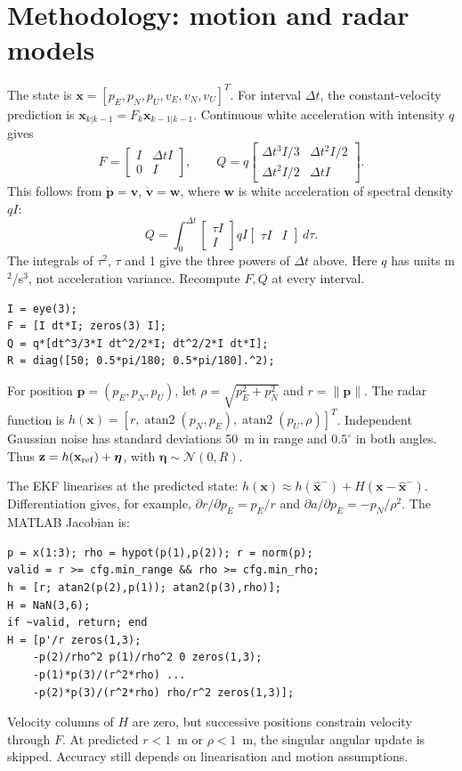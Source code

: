 \documentclass[12pt,a4paper]{article}
\begin{document}
\section{Methodology: motion and radar models}
The state is $\mathbf{x}=[p_E,p_N,p_U,v_E,v_N,v_U]^T$. For interval $\Delta t$, the constant-velocity prediction is $\mathbf{x}_{k|k-1}=F_k\mathbf{x}_{k-1|k-1}$. Continuous white acceleration with intensity $q$ gives
\[
F=\begin{bmatrix}I&\Delta t I\\0&I\end{bmatrix},\qquad
Q=q\begin{bmatrix}\Delta t^3 I/3&\Delta t^2 I/2\\\Delta t^2 I/2&\Delta t I\end{bmatrix}.
\]
This follows from $\dot{\mathbf p}=\mathbf v$, $\dot{\mathbf v}=\mathbf w$, where $\mathbf w$ is white acceleration of spectral density $qI$:
\[
Q=\int_0^{\Delta t}\begin{bmatrix}\tau I\\I\end{bmatrix}
qI\begin{bmatrix}\tau I&I\end{bmatrix}\,d\tau.
\]
The integrals of $\tau^2$, $\tau$ and 1 give the three powers of $\Delta t$ above. Here $q$ has units m$^2$/s$^3$, not acceleration variance. Recompute $F,Q$ at every interval.
\begin{lstlisting}
I = eye(3);
F = [I dt*I; zeros(3) I];
Q = q*[dt^3/3*I dt^2/2*I; dt^2/2*I dt*I];
R = diag([50; 0.5*pi/180; 0.5*pi/180].^2);
\end{lstlisting}
For position $\mathbf{p}=(p_E,p_N,p_U)$, let $\rho=\sqrt{p_E^2+p_N^2}$ and $r=\|\mathbf{p}\|$. The radar function is $h(\mathbf{x})=[r,\operatorname{atan2}(p_N,p_E),\operatorname{atan2}(p_U,\rho)]^T$. Independent Gaussian noise has standard deviations 50~m in range and $0.5^\circ$ in both angles. Thus $\mathbf{z}=h(\mathbf{x}_{\rm ref})+\boldsymbol{\eta}$, with $\boldsymbol{\eta}\sim\mathcal{N}(0,R)$.

The EKF linearises at the predicted state: $h(\mathbf x)\approx h(\hat{\mathbf x}^{-})+H(\mathbf x-\hat{\mathbf x}^{-})$. Differentiation gives, for example, $\partial r/\partial p_E=p_E/r$ and $\partial a/\partial p_E=-p_N/\rho^2$. The MATLAB Jacobian is:
\begin{lstlisting}
p = x(1:3); rho = hypot(p(1),p(2)); r = norm(p);
valid = r >= cfg.min_range && rho >= cfg.min_rho;
h = [r; atan2(p(2),p(1)); atan2(p(3),rho)];
H = NaN(3,6);
if ~valid, return; end
H = [p'/r zeros(1,3);
    -p(2)/rho^2 p(1)/rho^2 0 zeros(1,3);
    -p(1)*p(3)/(r^2*rho) ...
    -p(2)*p(3)/(r^2*rho) rho/r^2 zeros(1,3)];
\end{lstlisting}
Velocity columns of $H$ are zero, but successive positions constrain velocity through $F$. At predicted $r<1$~m or $\rho<1$~m, the singular angular update is skipped. Accuracy still depends on linearisation and motion assumptions.
\clearpage
\end{document}
